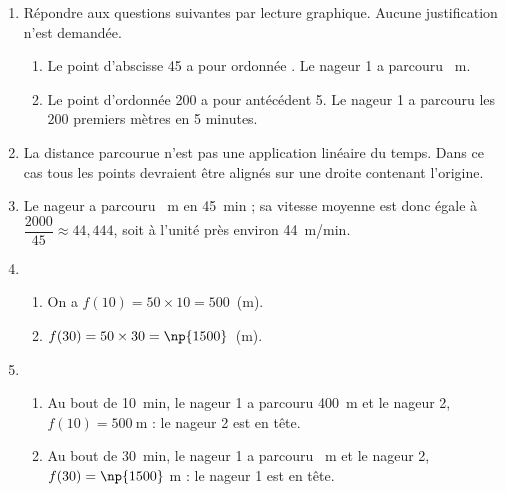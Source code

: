 \begin{enumerate}
\item Répondre aux questions suivantes par lecture graphique. Aucune justification n'est demandée.
	\begin{enumerate}
		\item %
Le point d'abscisse 45 a pour ordonnée . Le nageur 1 a parcouru ~m.
		\item %
Le point d'ordonnée 200 a pour antécédent 5. Le nageur 1 a parcouru les $200$ premiers mètres en 5 minutes.
	\end{enumerate}
	
\item La distance parcourue n'est pas une application linéaire du temps. Dans ce cas tous les points devraient être alignés sur une droite contenant l'origine.
\item %
Le nageur a parcouru ~m en 45~min ; sa vitesse moyenne est donc égale à $\dfrac{2000}{45}\approx 44,444$, soit à l'unité près environ 44~m/min.
\item %
	\begin{enumerate}
		\item %
On a $f(10) = 50 \times 10 = 500$~(m).
		\item %
$f(30) = 50 \times 30 = \np{1500}$~(m).
	\end{enumerate}
\item %
	\begin{enumerate}
		\item %
Au bout de 10~min, le nageur 1 a parcouru 400~m et le nageur 2, $f(10) = 500~$m : le nageur 2 est en tête.
		\item %
Au bout de 30~min, le nageur 1 a parcouru ~m et le nageur 2, $f(30) = \np{1500}~$m : le nageur 1 est en tête.
	\end{enumerate}
\end{enumerate}

\vspace{0,5cm}

